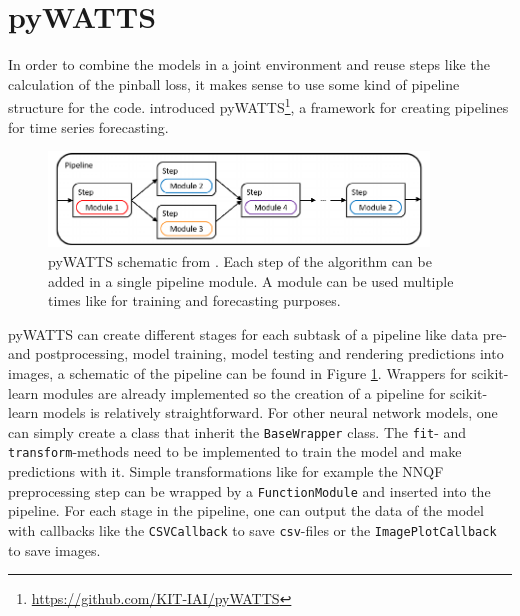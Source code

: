 \section{pyWATTS}
\label{sec:pywatts}

In order to combine the models in a joint environment 
and reuse steps like the calculation of the pinball loss, 
it makes sense to use some kind of pipeline structure for the code. 
\Textcite{Heidrich2021} introduced 
pyWATTS\footnote{\url{https://github.com/KIT-IAI/pyWATTS}}, a framework 
for creating pipelines for time series forecasting. 

\begin{figure}[h]%
    \centering
    \includegraphics[width=0.9\textwidth]{plots/pywatts-schematic.pdf}
    \caption[pywATTS schematic]{pyWATTS schematic from \Textcite{Heidrich2021}. 
    Each step of the algorithm can be added in a single pipeline module. 
    A module can be used multiple times like for training and forecasting purposes.}
    \label{fig:pywatts-schematic}%
\end{figure}

pyWATTS can create different stages for each subtask of a pipeline like 
data pre- and postprocessing, model training, model testing and 
rendering predictions into images, a schematic of the pipeline 
can be found in Figure \ref{fig:pywatts-schematic}. Wrappers for scikit-learn 
modules are already implemented so the creation of a pipeline 
for scikit-learn models is relatively straightforward. 
For other neural network models, one can simply create a class that inherit the 
\texttt{BaseWrapper} class. The \texttt{fit}- and \texttt{transform}-methods 
need to be implemented to train the model and make predictions with it. 
Simple transformations like for example the NNQF preprocessing step can be 
wrapped by a \texttt{FunctionModule} and inserted into the pipeline.
For each stage in the pipeline, one can output the data of the model 
with callbacks like the \texttt{CSVCallback} to save \texttt{csv}-files or 
the \texttt{ImagePlotCallback} to save images.